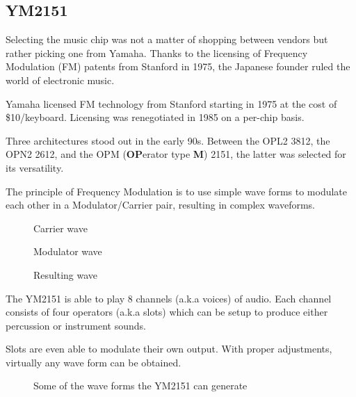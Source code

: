 \subsection{YM2151}

Selecting the music chip was not a matter of shopping between vendors but rather picking one from Yamaha. Thanks to the licensing of Frequency Modulation (FM) patents from Stanford in 1975, the Japanese founder ruled the world of electronic music.

\begin{trivia}
Yamaha licensed FM technology from Stanford starting in 1975 at the cost of \$10/keyboard. Licensing was renegotiated in 1985 on a per-chip basis\cite{fm_licensing}.

\end{trivia}
Three architectures stood out in the early 90s. Between the OPL2 3812, the OPN2 2612, and the OPM (\textbf{OP}erator type \textbf{M}) 2151, the latter was selected for its versatility. 



The principle of Frequency Modulation is to use simple wave forms to modulate each other in a Modulator/Carrier pair, resulting in complex waveforms\cite{fmProgramming}.

\begin{figure}[H]
\caption*{Carrier wave}
\end{figure}

\begin{figure}[H]
\caption*{Modulator wave}
\end{figure}

\begin{figure}[H]
\caption*{Resulting wave}
\end{figure}







The YM2151 is able to play 8 channels (a.k.a voices) of audio. Each channel consists of four operators (a.k.a slots) which can be setup to produce either percussion or instrument sounds.  

Slots are even able to modulate their own output. With proper adjustments, virtually any wave form can be obtained. 
 
\begin{figure}[H]
\caption*{Some of the wave forms the YM2151 can generate}
\end{figure}


